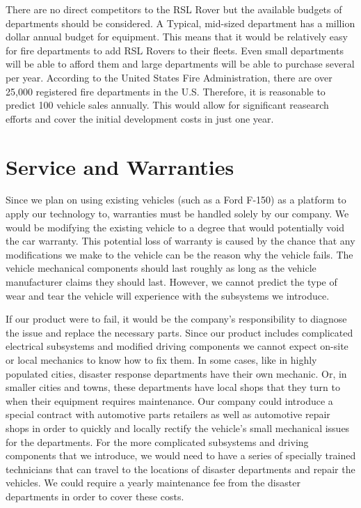 There are no direct competitors to the RSL Rover but the available budgets of departments should be considered. A Typical, mid-sized department has a million dollar annual budget for equipment. This means that it would be relatively easy for fire departments to add RSL Rovers to their fleets. Even small departments will be able to afford them and large departments will be able to purchase several per year. According to the United States Fire Administration, there are over 25,000 registered fire departments in the U.S. Therefore, it is reasonable to predict 100 vehicle sales annually. This would allow for significant reasearch efforts and cover the initial development costs in just one year.

\section{Service and Warranties}

Since we plan on using existing vehicles (such as a Ford F-150) as a platform to apply our technology to, warranties must be handled solely by our company. We would be modifying the existing vehicle to a degree that would potentially void the car warranty. This potential loss of warranty is caused by the chance that any modifications we make to the vehicle can be the reason why the vehicle fails. The vehicle mechanical components should last roughly as long as the vehicle manufacturer claims they should last. However, we cannot predict the type of wear and tear the vehicle will experience with the subsystems we introduce. 

If our product were to fail, it would be the company's responsibility to diagnose the issue and replace the necessary parts. Since our product includes complicated electrical subsystems and modified driving components we cannot expect on-site or local mechanics to know how to fix them. In some cases, like in highly populated cities, disaster response departments have their own mechanic. Or, in smaller cities and towns, these departments have local shops that they turn to when their equipment requires maintenance.  Our company could introduce a special contract with automotive parts retailers as well as automotive repair shops in order to quickly and locally rectify the vehicle's small mechanical issues  for the departments. For the more complicated subsystems and driving components that we introduce, we would need to have a series of specially trained technicians that can travel to the locations of disaster departments and repair the vehicles. We could require a yearly maintenance fee from the disaster departments in order to cover these costs. 

